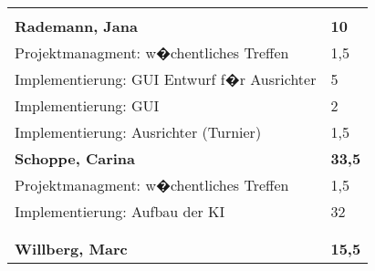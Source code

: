 \documentclass[a4paper,11pt]{scrartcl}
\begin{document}
\begin{longtable}{| p{13.8cm} | C{2.4cm} |}

	&

	\\
	\hline


	&

	\\
	\hline
	\hline


	\textbf{Rademann, Jana} & \textbf{10}\\ %
	\hline

  Projektmanagment: w�chentliches Treffen
	&
  1,5
	\\
	\hline

  Implementierung: GUI Entwurf f�r Ausrichter
	&
  5
	\\
	\hline

  Implementierung: GUI
	&
  2
	\\
	\hline

  Implementierung: Ausrichter (Turnier)
	&
  1,5
	\\
	\hline
	\hline


	\textbf{Schoppe, Carina} & \textbf{33,5}\\ %
	\hline

  Projektmanagment: w�chentliches Treffen
	&
  1,5
	\\
	\hline

  Implementierung: Aufbau der KI
	&
  32
	\\
	\hline


	&

	\\
	\hline


	&

	\\
	\hline
	\hline


	\textbf{Willberg, Marc} & \textbf{15,5}\\ %
	\hline


\end{longtable}
\end{document}
